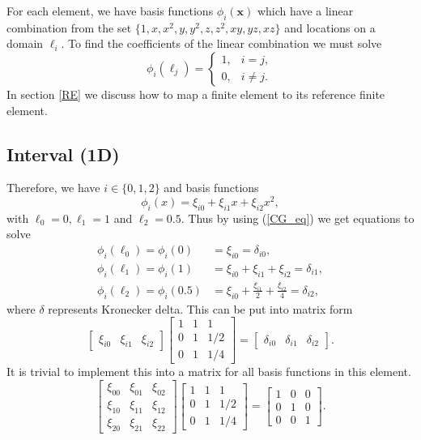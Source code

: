 \documentclass[12pt]{ociamthesis}
\begin{document}
For each element, we have basis functions $\phi_i(\mathbf{x})$ which have a linear combination from the set $\{1, x, x^2, y, y^2, z, z^2, xy, yz, xz\}$ and locations on a domain $\ell_i$.  To find the coefficients of the linear combination we must solve
\begin{equation} \label{CG_eq}
\phi_i(\ell_j) =
\begin{cases}
1, &i=j,\\
0, &i\neq j.
\end{cases}
\end{equation}
In section \ref{RE} we discuss how to map a finite element to its reference finite element.
\subsection{Interval (1D)}
Therefore, we have $i \in \{0, 1, 2\}$ and basis functions 
\begin{equation}
\phi_i(x) = \xi_{i0} + \xi_{i1}x + \xi_{i2}x^2,
\end{equation}
with $\ell_0 = 0, \ell_1 = 1$ and $\ell_2 = 0.5$. Thus by using (\ref{CG_eq}) we get equations to solve
\begin{align}
\phi_i(\ell_0) = \phi_i(0) &= \xi_{i0} = \delta_{i0},\\
\phi_i(\ell_1) = \phi_i(1) &= \xi_{i0} + \xi_{i1} + \xi_{i2} = \delta_{i1},\\
\phi_i(\ell_2) = \phi_i(0.5) &= \xi_{i0} + \frac{\xi_{i1}}{2} + \frac{\xi_{i2}}{4} = \delta_{i2},
\end{align}
where $\delta$ represents Kronecker delta. This can be put into matrix form
\begin{equation}
\left[ \begin{matrix}
\xi_{i0} & \xi_{i1} & \xi_{i2}
\end{matrix} \right]
\left[ \begin{matrix}
1 & 1 & 1 \\
0 & 1 & 1/2 \\
0 & 1 & 1/4
\end{matrix} \right] = 
\left[ \begin{matrix}
\delta_{i0} & \delta_{i1} & \delta_{i2}
\end{matrix} \right].
\end{equation}
It is trivial to implement this into a matrix for all basis functions in this element.
\begin{equation}
\left[ \begin{matrix}
\xi_{00} & \xi_{01} & \xi_{02} \\
\xi_{10} & \xi_{11} & \xi_{12} \\
\xi_{20} & \xi_{21} & \xi_{22} 
\end{matrix} \right]
\left[ \begin{matrix}
1 & 1 & 1 \\
0 & 1 & 1/2 \\
0 & 1 & 1/4
\end{matrix} \right] = 
\left[ \begin{matrix}
1 & 0 & 0 \\
0 & 1 & 0 \\
0 & 0 & 1
\end{matrix} \right].
\end{equation}
\end{document}
